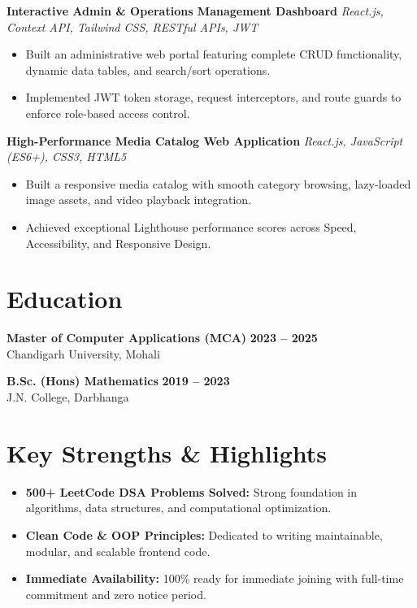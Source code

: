 \documentclass[a4paper,10pt]{article}
\begin{document}
\textbf{Interactive Admin \& Operations Management Dashboard}
\hfill
\textit{React.js, Context API, Tailwind CSS, RESTful APIs, JWT}

\begin{itemize}

    \item Built an administrative web portal featuring complete CRUD functionality, dynamic data tables, and search/sort operations.

    \item Implemented JWT token storage, request interceptors, and route guards to enforce role-based access control.

\end{itemize}


\textbf{High-Performance Media Catalog Web Application}
\hfill
\textit{React.js, JavaScript (ES6+), CSS3, HTML5}

\begin{itemize}

    \item Built a responsive media catalog with smooth category browsing, lazy-loaded image assets, and video playback integration.

    \item Achieved exceptional Lighthouse performance scores across Speed, Accessibility, and Responsive Design.

\end{itemize}

\section*{Education}

\textbf{Master of Computer Applications (MCA)}
\hfill
\textbf{2023 -- 2025}
\\
Chandigarh University, Mohali

\vspace{3pt}

\textbf{B.Sc. (Hons) Mathematics}
\hfill
\textbf{2019 -- 2023}
\\
J.N. College, Darbhanga

\section*{Key Strengths \& Highlights}

\begin{itemize}

    \item \textbf{500+ LeetCode DSA Problems Solved:} Strong foundation in algorithms, data structures, and computational optimization.

    \item \textbf{Clean Code \& OOP Principles:} Dedicated to writing maintainable, modular, and scalable frontend code.

    \item \textbf{Immediate Availability:} 100\% ready for immediate joining with full-time commitment and zero notice period.

\end{itemize}

\end{document}
